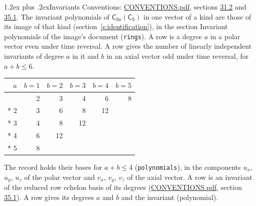 \documentclass[10pt,a4paper]{article}
\makeatletter
\renewcommand\section{\@startsection{section}{1}{\z@}{-3ex plus -1ex minus -.2ex}%
  {1.2ex plus .2ex}{\normalfont\large\sffamily\bfseries\color{parttitle}}}
\numberwithin{equation}{section}
\newcommand{\grp}[1]{\mathsf{#1}}
\makeatother
\begin{document}
\section{Invariants}\label{s:invariants}
Conventions: \href{../../CONVENTIONS.pdf}{CONVENTIONS.pdf}, sections \href{../../CONVENTIONS.pdf\#conv.31.2}{31.2} and \href{../../CONVENTIONS.pdf\#conv.35.1}{35.1}.
The invariant polynomials of $\grp{C_{5v}}(\grp{C_{5}})$ in one vector of a kind are those of its image of that kind (section~\ref{s:identification}), in the section Invariant polynomials of the image's document (\texttt{rings}).
\leavevmode\label{n:index.degree.polar}\label{n:index.degree.axial}A row is a degree $a$ in a polar vector even under time reversal. A row gives the number of linearly independent invariants of degree $a$ in it and $b$ in an axial vector odd under time reversal, for $a + b \le 6$.
{\small\begin{longtable}{@{}rrrrrr@{}}\toprule
$a$ & $b = 1$ & $b = 2$ & $b = 3$ & $b = 4$ & $b = 5$\\\midrule\endhead
\bottomrule\endfoot\endlastfoot
1 & 2 & 3 & 4 & 6 & 8\\*
2 & 3 & 6 & 8 & 12 & \\*
3 & 4 & 8 & 12 &  & \\*
4 & 6 & 12 &  &  & \\*
5 & 8 &  &  &  & \\
\bottomrule\end{longtable}}
\leavevmode\label{n:local.component.polar}\label{n:local.component.axial}The record holds their bases for $a + b \le 4$ (\texttt{polynomials}), in the components $u_{x}$, $u_{y}$, $u_{z}$ of the polar vector and $v_{x}$, $v_{y}$, $v_{z}$ of the axial vector. \label{n:head.polynomial}A row is an invariant of the reduced row echelon basis of its degrees (\href{../../CONVENTIONS.pdf}{CONVENTIONS.pdf}, section \href{../../CONVENTIONS.pdf\#conv.35.1}{35.1}). A row gives its degrees $a$ and $b$ and the invariant (polynomial).
\end{document}
